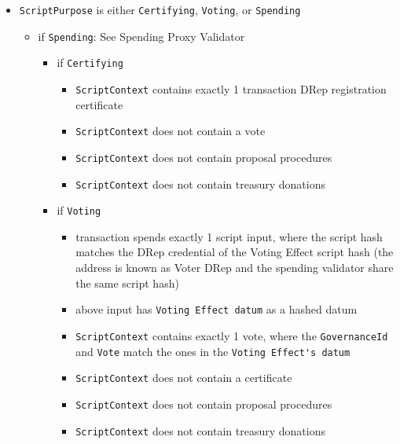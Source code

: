 \documentclass{article}
\begin{document}
\begin{itemize}
  \item \verb|ScriptPurpose| is either \verb|Certifying|, \verb|Voting|, or \verb|Spending|
        \begin{itemize}
          \item if \verb|Spending|: See Spending Proxy Validator
                \begin {itemize}
          \item if \verb|Certifying|
                \begin{itemize}
                  \item \verb|ScriptContext| contains exactly 1 transaction DRep registration certificate
                  \item \verb|ScriptContext| does not contain a vote
                  \item \verb|ScriptContext| does not contain proposal procedures
                  \item \verb|ScriptContext| does not contain treasury donations
                \end{itemize}
          \item if \verb|Voting|
                \begin{itemize}
                  \item transaction spends exactly 1 script input, where the script hash matches the DRep credential of the Voting Effect script hash (the address is known as Voter DRep and the spending validator share the same script hash)
                  \item above input has \verb|Voting Effect datum| as a hashed datum
                  \item \verb|ScriptContext| contains exactly 1 vote, where the \verb|GovernanceId| and \verb|Vote| match the ones in the \verb|Voting Effect's datum|
                  \item \verb|ScriptContext| does not contain a certificate
                  \item \verb|ScriptContext| does not contain proposal procedures
                  \item \verb|ScriptContext| does not contain treasury donations
                \end{itemize}

                \end {itemize}

        \end{itemize}
\end{itemize}
\end{document}
